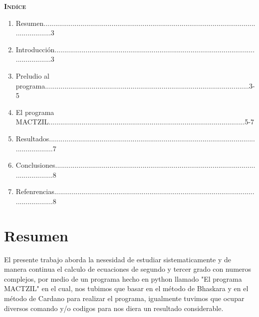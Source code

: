 \documentclass[12pt,letterpaper]{article}
\begin{document}
\pagestyle{fancy}
        \fancyhf{}
\begin{center}
    {\textbf{\textsc{\Huge{Indíce}}}}
\end{center}
\begin{enumerate}
\item Resumen...............................................................................................................................3
\item 
Introducción.........................................................................................................................3
\item 
Preludio al programa.........................................................................................................3-5
\item El programa MACTZIL.....................................................................................................5-7
\item Resultados.............................................................................................................................7
\item Conclusiones..........................................................................................................................8
\item Refenrencias..........................................................................................................................8
    
\end{enumerate}
\newpage

\pagestyle{fancy}
        \fancyhf{}
        \rfoot{\thepage}

\section{Resumen}
\noindent El presente trabajo aborda la nesesidad de estudiar sistematicamente y de manera continua el calculo de ecuaciones de segundo y tercer grado con numeros complejos, por medio de un programa hecho en python llamado "El programa MACTZIL" en el cual, nos tubimos que basar en el método de Bhaskara y en el método de Cardano para realizar el programa, igualmente tuvimos que ocupar diversos comando y/o codigos para nos diera un resultado considerable.
\\
\end{document}
